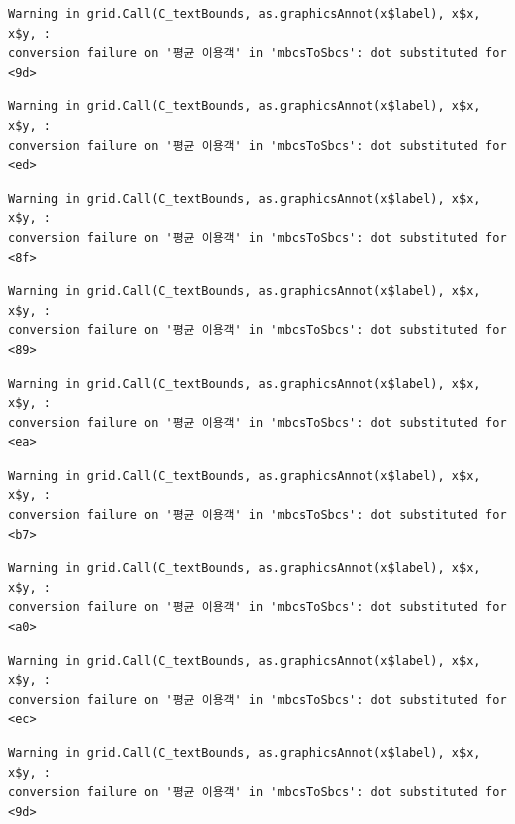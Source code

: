 \documentclass[
  letterpaper,
  DIV=11,
  numbers=noendperiod]{scrreprt}
\begin{document}
\begin{verbatim}
Warning in grid.Call(C_textBounds, as.graphicsAnnot(x$label), x$x, x$y, :
conversion failure on '평균 이용객' in 'mbcsToSbcs': dot substituted for <9d>
\end{verbatim}

\begin{verbatim}
Warning in grid.Call(C_textBounds, as.graphicsAnnot(x$label), x$x, x$y, :
conversion failure on '평균 이용객' in 'mbcsToSbcs': dot substituted for <ed>
\end{verbatim}

\begin{verbatim}
Warning in grid.Call(C_textBounds, as.graphicsAnnot(x$label), x$x, x$y, :
conversion failure on '평균 이용객' in 'mbcsToSbcs': dot substituted for <8f>
\end{verbatim}

\begin{verbatim}
Warning in grid.Call(C_textBounds, as.graphicsAnnot(x$label), x$x, x$y, :
conversion failure on '평균 이용객' in 'mbcsToSbcs': dot substituted for <89>
\end{verbatim}

\begin{verbatim}
Warning in grid.Call(C_textBounds, as.graphicsAnnot(x$label), x$x, x$y, :
conversion failure on '평균 이용객' in 'mbcsToSbcs': dot substituted for <ea>
\end{verbatim}

\begin{verbatim}
Warning in grid.Call(C_textBounds, as.graphicsAnnot(x$label), x$x, x$y, :
conversion failure on '평균 이용객' in 'mbcsToSbcs': dot substituted for <b7>
\end{verbatim}

\begin{verbatim}
Warning in grid.Call(C_textBounds, as.graphicsAnnot(x$label), x$x, x$y, :
conversion failure on '평균 이용객' in 'mbcsToSbcs': dot substituted for <a0>
\end{verbatim}

\begin{verbatim}
Warning in grid.Call(C_textBounds, as.graphicsAnnot(x$label), x$x, x$y, :
conversion failure on '평균 이용객' in 'mbcsToSbcs': dot substituted for <ec>
\end{verbatim}

\begin{verbatim}
Warning in grid.Call(C_textBounds, as.graphicsAnnot(x$label), x$x, x$y, :
conversion failure on '평균 이용객' in 'mbcsToSbcs': dot substituted for <9d>
\end{verbatim}
\end{document}
